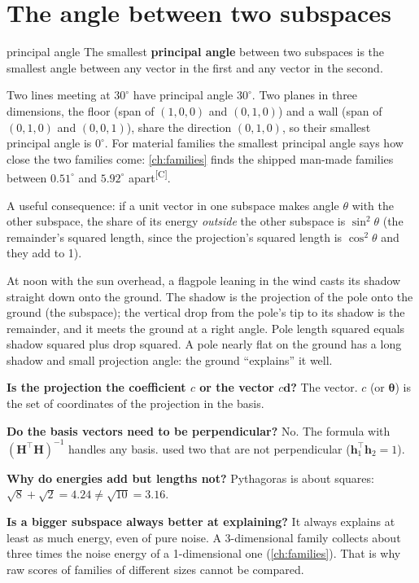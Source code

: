 \documentclass[11pt,a4paper,oneside,openany]{book}
\newcommand{\B}[1]{{\symbf{#1}}}
\newcommand{\B}[1]{{\bm{#1}}}
\newcommand{\comp}{\textsuperscript{\textsf{\scriptsize[C]}}}
\newcommand{\T}{^{\top}}
\newcommand{\vd}{\B{d}}
\newcommand{\vh}{\B{h}}
\newcommand{\vtheta}{\B{\theta}}
\newcommand{\mH}{\B{H}}
\begin{document}
\section{The angle between two subspaces}

\begin{defn}{principal angle}
The smallest \textbf{principal angle} between two subspaces is the smallest angle between any vector in the first and any vector
in the second.
\end{defn}

Two lines meeting at $30^\circ$ have principal angle $30^\circ$. Two planes in three dimensions, the floor (span of $(1,0,0)$ and
$(0,1,0)$) and a wall (span of $(0,1,0)$ and $(0,0,1)$), share the direction $(0,1,0)$, so their smallest principal angle is
$0^\circ$. For material families the smallest principal angle says how close the two families come: \cref{ch:families} finds the
shipped man-made families between $0.51^\circ$ and $5.92^\circ$ apart\comp.

A useful consequence: if a unit vector in one subspace makes angle $\theta$ with the other subspace, the share of its energy
\emph{outside} the other subspace is $\sin^2\theta$ (the remainder's squared length, since the projection's squared length is
$\cos^2\theta$ and they add to 1).

\begin{analogy}
At noon with the sun overhead, a flagpole leaning in the wind casts its shadow straight down onto the ground. The shadow is the
projection of the pole onto the ground (the subspace); the vertical drop from the pole's tip to its shadow is the remainder, and
it meets the ground at a right angle. Pole length squared equals shadow squared plus drop squared. A pole nearly flat on the
ground has a long shadow and small projection angle: the ground ``explains'' it well.
\end{analogy}

\begin{confusions}
\textbf{Is the projection the coefficient $c$ or the vector $c\vd$?} The vector. $c$ (or $\vtheta$) is the set of
coordinates of the projection in the basis.

\textbf{Do the basis vectors need to be perpendicular?} No. The formula with $(\mH\T\mH)^{-1}$ handles any basis.
 used two that are not perpendicular ($\vh_1\T\vh_2=1$).

\textbf{Why do energies add but lengths not?} Pythagoras is about squares: $\sqrt{8}+\sqrt{2}=4.24\neq\sqrt{10}=3.16$.

\textbf{Is a bigger subspace always better at explaining?} It always explains at least as much energy, even of pure noise. A
3-dimensional family collects about three times the noise energy of a 1-dimensional one (\cref{ch:families}). That is why
raw scores of families of different sizes cannot be compared.
\end{confusions}
\end{document}
